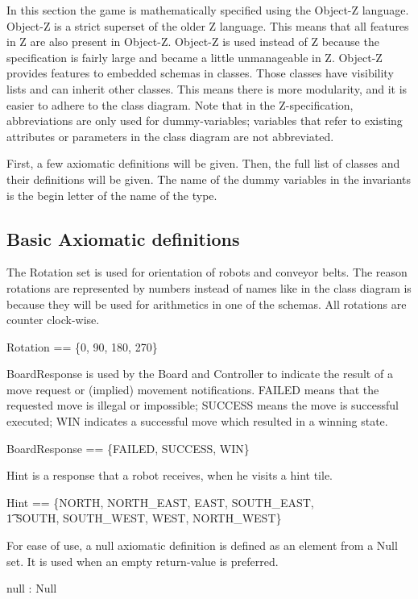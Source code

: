 In this section the game is mathematically specified using the Object-Z language. Object-Z is a strict superset of the older Z language. This means that all features in Z are also present in Object-Z. Object-Z is used instead of Z because the specification is fairly large and became a little unmanageable in Z. Object-Z provides features to embedded schemas in classes. Those classes have visibility lists and can inherit other classes. This means there is more modularity, and it is easier to adhere to the class diagram.
Note that in the Z-specification, abbreviations are only used for dummy-variables; variables that refer to existing attributes or parameters in the class diagram are not abbreviated.

First, a few axiomatic definitions will be given. Then, the full list of classes and their definitions will be given. The name of the dummy variables in the invariants is the begin letter of the name of the type.

\subsection{Basic Axiomatic definitions}
The Rotation set is used for orientation of robots and conveyor belts. The reason rotations are represented by numbers instead of names like in the class diagram is because they will be used for arithmetics in one of the schemas. All rotations are counter clock-wise.
\begin{axdef}
Rotation == \{0, 90, 180, 270\}
\end{axdef}

BoardResponse is used by the Board and Controller to indicate the result of a move request or (implied) movement notifications. FAILED means that the requested move is illegal or impossible; SUCCESS means the move is successful executed; WIN indicates a successful move which resulted in a winning state.
\begin{axdef}
BoardResponse == \{FAILED, SUCCESS, WIN\}
\end{axdef}

Hint is a response that a robot receives, when he visits a hint tile.
\begin{axdef}
Hint == \{NORTH, NORTH\_EAST, EAST, SOUTH\_EAST, \\ \t1 SOUTH, SOUTH\_WEST, WEST, NORTH\_WEST\}
\end{axdef}

For ease of use, a null axiomatic definition is defined as an element from a Null set. It is used when an empty return-value is preferred.
\begin{zed}
[Null]
\end{zed}
\begin{axdef}
null : Null
\end{axdef}

